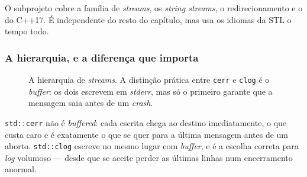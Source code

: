 O subprojeto  cobre a família de \emph{streams}, os
\emph{string streams}, o redirecionamento e o  do
C++17. É independente do resto do capítulo, mas usa os idiomas da STL o tempo
todo.

\subsubsection{A hierarquia, e a diferença que importa}

\begin{figure}[htbp]
\centering
{}
\caption{A hierarquia de \emph{streams}. A distinção prática entre
         \texttt{cerr} e \texttt{clog} é o \emph{buffer}: os dois escrevem em
         \emph{stderr}, mas só o primeiro garante que a mensagem saia antes de
         um \emph{crash}.}
\label{fig:streams}
\end{figure}

\begin{regra}
\texttt{std::cerr} não é \emph{buffered}: cada escrita chega ao destino
imediatamente, o que custa caro e é exatamente o que se quer para a última
mensagem antes de um aborto. \texttt{std::clog} escreve no mesmo lugar com
\emph{buffer}, e é a escolha correta para \emph{log} volumoso --- desde que se
aceite perder as últimas linhas num encerramento anormal.
\end{regra}


